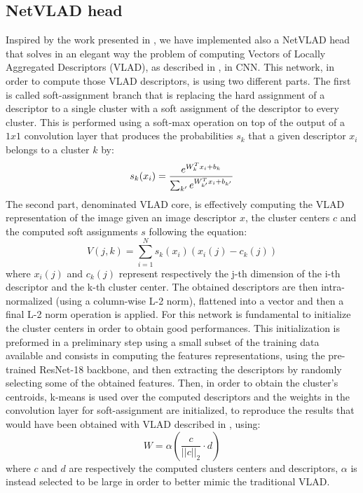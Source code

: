 \documentclass[10pt,twocolumn,letterpaper]{article}
\begin{document}
\subsection{NetVLAD head}\label{sec:NETVLAD}
Inspired by the work presented in \cite{NETVLAD}, we have implemented also a NetVLAD head that solves in an 
elegant way the problem of computing Vectors of Locally Aggregated Descriptors (VLAD), as described in \cite{VLAD},
in CNN. This network, in order to compute those VLAD descriptors, is using two different parts. 
The first is called soft-assignment branch that is replacing the hard assignment of a descriptor to a single cluster
with a soft assignment of the descriptor to every cluster. This is performed using a soft-max operation on top of the output of a $1x1$
convolution layer that produces the probabilities $s_k$ that a given descriptor $x_i$ belongs to a cluster $k$ by:
\begin{equation}
	s_k(x_i) = {{e^{W_k^T x_i+b_k}}\over{\sum_{k'} e^{W_{k'}^T x_i+b_{k'}}}}
\end{equation} 
The second part, denominated VLAD core, is effectively computing the 
VLAD representation of the image given an image descriptor $x$, the cluster centers $c$ and the computed soft assignments
$s$ following the equation:
\begin{equation}
	V(j,k) = \sum_{i=1}^N s_k(x_i) (x_i(j) - c_k(j))
\end{equation} 
where $x_i(j)$ and $c_k(j)$ represent respectively the j-th dimension of the i-th descriptor and the k-th cluster center.
The obtained descriptors are then intra-normalized (using a column-wise L-2 norm), flattened into a vector and then a
final L-2 norm operation is applied.
For this network is fundamental to initialize the cluster centers in order to obtain good performances. This initialization
is preformed in a preliminary step using a small subset of the training data available and consists in computing the features 
representations, using the pre-trained ResNet-18 backbone, and then extracting the descriptors by randomly selecting some of the 
obtained features. Then, in order to obtain the cluster's centroids, k-means is used over the computed descriptors and the 
weights in the convolution layer for soft-assignment are initialized, to reproduce the results that would have been obtained
with VLAD described in \cite{VLAD}, using:
\begin{equation}
   W = \alpha ({\frac{c}{{||c||}_2}} \cdot d )
\end{equation}
where $c$ and $d$ are respectively the computed clusters centers and descriptors, $\alpha$ is instead selected to be large
in order to better mimic the traditional VLAD.
\end{document}
